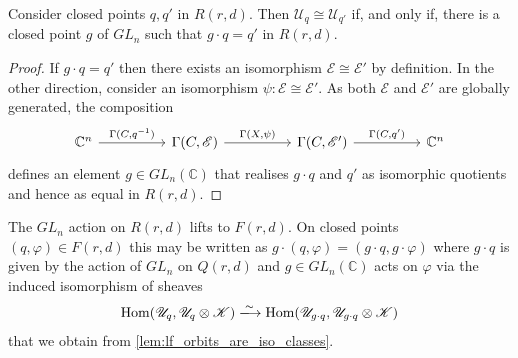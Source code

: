 \documentclass[12pt]{ociamthesis}  %
\begin{document}
\begin{lemma}\label{lem:lf_orbits_are_iso_classes}
  Consider closed points $q,q'$ in $R(r,d)$.
  Then $\mathscr U_q\cong\mathscr U_{q'}$
  if, and only if, there is a closed point $g$ of $GL_n$
  such that $g\cdot q = q'$ in $R(r,d)$.
  \begin{proof}
    If $g\cdot q = q'$ then there exists an isomorphism
    $\mathscr E\cong\mathscr E'$ by definition. In the other direction,
    consider an isomorphism $\psi:\mathscr E\cong\mathscr E'$.
    As both $\mathscr E$ and $\mathscr E'$ are globally generated,
    the composition
    \begin{equation*}
      \begin{tikzcd}
        {\mathbb C^n} && {\Gamma(C,\mathscr E)} && {\Gamma(C,\mathscr E')} && {\mathbb C^n}
        \arrow["{\Gamma(C,q^{-1})}", from=1-1, to=1-3]
        \arrow["{\Gamma(X,\psi)}", from=1-3, to=1-5]
        \arrow["{\Gamma(C,q')}", from=1-5, to=1-7]
      \end{tikzcd}
    \end{equation*}
    defines an element $g\in GL_n(\mathbb C)$ that realises
    $g\cdot q$ and $q'$ as isomorphic quotients and hence as
    equal in $R(r,d)$.
  \end{proof}
\end{lemma}

\begin{example}
  The $GL_n$ action on $R(r,d)$ lifts to $F(r,d)$. \cite[281-282]{nitsure1991}
  On closed points $(q,\varphi)\in F(r,d)$ this may be written
  as $g\cdot(q,\varphi) = (g\cdot q, g\cdot\varphi)$ where
  $g\cdot q$ is given by the action of $GL_n$ on $Q(r,d)$ and
  $g\in GL_n(\mathbb C)$ acts on $\varphi$ via the induced isomorphism
  of sheaves
  \begin{align*}
    \Hom(\mathscr U_q,\mathscr U_q\otimes\mathscr K)
    \xlongrightarrow{\sim}
    \Hom(\mathscr U_{g\cdot q},\mathscr U_{g\cdot q}\otimes\mathscr K)
  \end{align*}
  that we obtain from \ref{lem:lf_orbits_are_iso_classes}.
\end{example}
\end{document}
